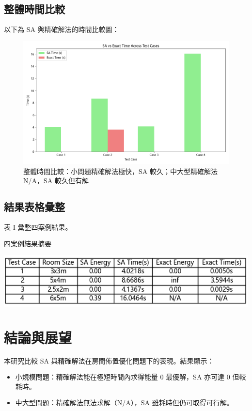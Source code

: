 \documentclass[conference]{IEEEtran}
\begin{document}
\FloatBarrier %

\subsection{整體時間比較}
以下為 SA 與精確解法的時間比較圖：

\begin{figure}[!htbp]
    \centering
   \includegraphics[width=\columnwidth]{time_comparison.png} 
    \caption{整體時間比較：小問題精確解法極快，SA 較久；中大型精確解法 N/A，SA 較久但有解}
\end{figure}

\FloatBarrier %

\subsection{結果表格彙整}
表 I 彙整四案例結果。

\begin{table}[!htbp]
\caption{四案例結果摘要}
\includegraphics[width=\columnwidth]{results_comparison_table.png} 
\end{table}

\FloatBarrier %

\section{結論與展望}
本研究比較 SA 與精確解法在房間佈置優化問題下的表現。結果顯示：
\begin{itemize}
    \item 小規模問題：精確解法能在極短時間內求得能量 0 最優解，SA 亦可達 0 但較耗時。
    \item 中大型問題：精確解法無法求解（N/A），SA 雖耗時但仍可取得可行解。
\end{itemize}
\end{document}
